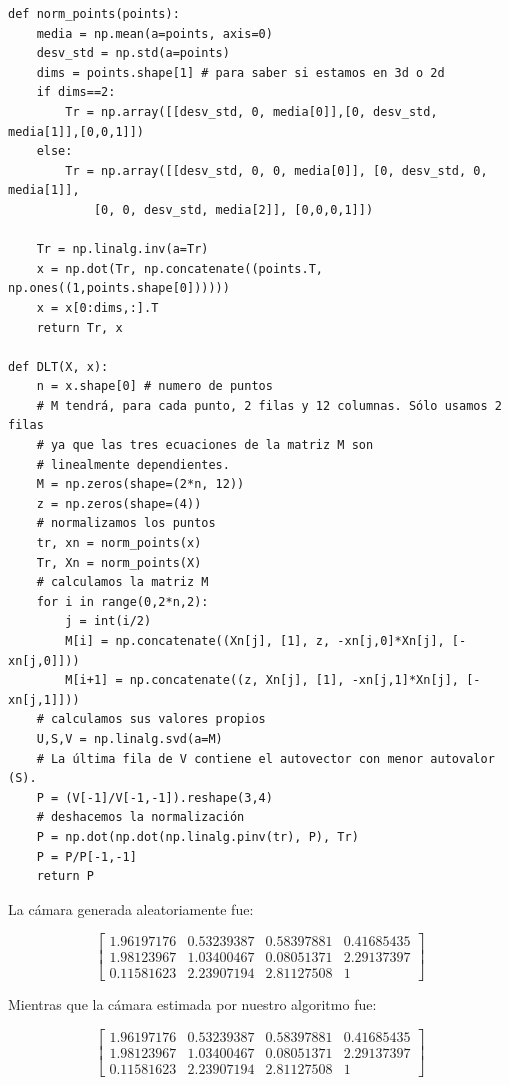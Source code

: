 \documentclass[11pt,a4paper]{article}
\theoremstyle{plain}
\theoremstyle{definition}
\begin{document}
\begin{verbatim}
def norm_points(points):
    media = np.mean(a=points, axis=0)
    desv_std = np.std(a=points)
    dims = points.shape[1] # para saber si estamos en 3d o 2d
    if dims==2:
        Tr = np.array([[desv_std, 0, media[0]],[0, desv_std, media[1]],[0,0,1]])
    else:
        Tr = np.array([[desv_std, 0, 0, media[0]], [0, desv_std, 0, media[1]], 
            [0, 0, desv_std, media[2]], [0,0,0,1]])

    Tr = np.linalg.inv(a=Tr)
    x = np.dot(Tr, np.concatenate((points.T, np.ones((1,points.shape[0])))))
    x = x[0:dims,:].T
    return Tr, x

def DLT(X, x):
    n = x.shape[0] # numero de puntos
    # M tendrá, para cada punto, 2 filas y 12 columnas. Sólo usamos 2 filas 
    # ya que las tres ecuaciones de la matriz M son
    # linealmente dependientes.
    M = np.zeros(shape=(2*n, 12))
    z = np.zeros(shape=(4))
    # normalizamos los puntos
    tr, xn = norm_points(x)
    Tr, Xn = norm_points(X)
    # calculamos la matriz M
    for i in range(0,2*n,2):
        j = int(i/2)
        M[i] = np.concatenate((Xn[j], [1], z, -xn[j,0]*Xn[j], [-xn[j,0]]))
        M[i+1] = np.concatenate((z, Xn[j], [1], -xn[j,1]*Xn[j], [-xn[j,1]]))
    # calculamos sus valores propios
    U,S,V = np.linalg.svd(a=M)
    # La última fila de V contiene el autovector con menor autovalor (S).
    P = (V[-1]/V[-1,-1]).reshape(3,4)
    # deshacemos la normalización
    P = np.dot(np.dot(np.linalg.pinv(tr), P), Tr)
    P = P/P[-1,-1]
    return P
\end{verbatim}

La cámara generada aleatoriamente fue:

\begin{displaymath}
\left[
\begin{matrix}
1.96197176 & 0.53239387 & 0.58397881 & 0.41685435 \\
1.98123967 & 1.03400467 & 0.08051371 & 2.29137397 \\
0.11581623 & 2.23907194 & 2.81127508 & 1
\end{matrix}
\right]
\end{displaymath}

Mientras que la cámara estimada por nuestro algoritmo fue:

\begin{displaymath}
\left[
\begin{matrix}    
1.96197176 & 0.53239387 & 0.58397881 & 0.41685435 \\
1.98123967 & 1.03400467 & 0.08051371 & 2.29137397 \\
0.11581623 & 2.23907194 & 2.81127508 & 1
\end{matrix}
\right]
\end{displaymath}
\end{document}
